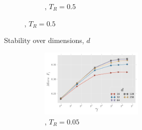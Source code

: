 \begin{figure}[t!]
\begin{subfigure}[b]{\columnwidth}
\begin{subfigure}[b]{\columnwidth}
\begin{subfigure}{0.5\columnwidth}
				    \addtocounter{subfigure}{-1}%
			        \renewcommand\thesubfigure{\alph{subfigure}4} %
	                \caption{\blogcatalog, $T_R=0.5$} %
		        \label{fig:stability_blogcatalog-dims_vs_passes}   
        \end{subfigure}        
        \label{fig:stability_blogcatalog-dims}
        \end{subfigure}%
        \addtocounter{subfigure}{-1}        
		\caption{Stability over dimensions, $d$}
		\label{fig:stability_dimensions}
		\end{subfigure}%
		\hfill
		\begin{subfigure}[b]{\columnwidth}			
		\begin{subfigure}[b]{\columnwidth}
    		    \begin{subfigure}[b]{0.5\columnwidth}
    	            \includegraphics[width=\columnwidth]{figures/stability/flickr_dims_vs_walks_per_node}%
			        \renewcommand\thesubfigure{\alph{subfigure}1}%
	                \caption{\flickr, $T_R=0.05$}    	            
    	            \label{fig:stability_flickr-passes_vs_dims}    	            
	    	    \end{subfigure}%
	        \begin{subfigure}[b]{0.5\columnwidth}

\end{subfigure}
\end{subfigure}
\end{subfigure}
\end{figure}
